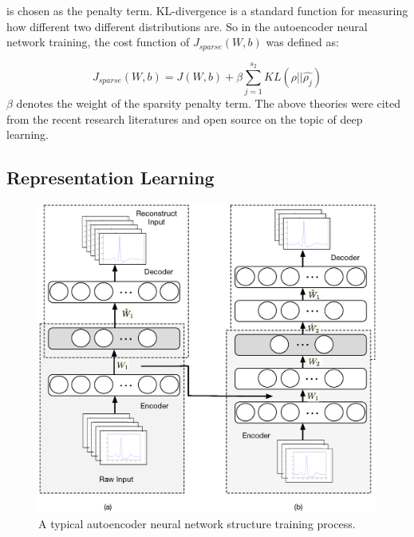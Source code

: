 \documentclass[graybox]{svmult}
\begin{document}
\noindent is chosen as the  penalty term. KL-divergence is a standard function for measuring how different two different distributions are. So in the autoencoder neural network training, the cost function of $J_{sparse}(W,b)$ was defined as:

\begin{equation}
J_{sparse}(W,b) = J(W,b) + \beta \sum_{j=1}^{s_2}KL(\rho||\hat{\rho_j})
\end{equation}
\noindent $\beta$ denotes the weight of the sparsity penalty term.
The above theories were cited from the recent research literatures \cite{zou2012deep} and open source \cite{ufldl} on the topic of deep learning.


\subsection{Representation Learning}


%
\begin{figure}[]
\sidecaption
\includegraphics[scale=.4]{autoencoder}
%
%
\caption{A typical autoencoder neural network structure training process.}
\label{fig:4}       %
\end{figure}
\end{document}
